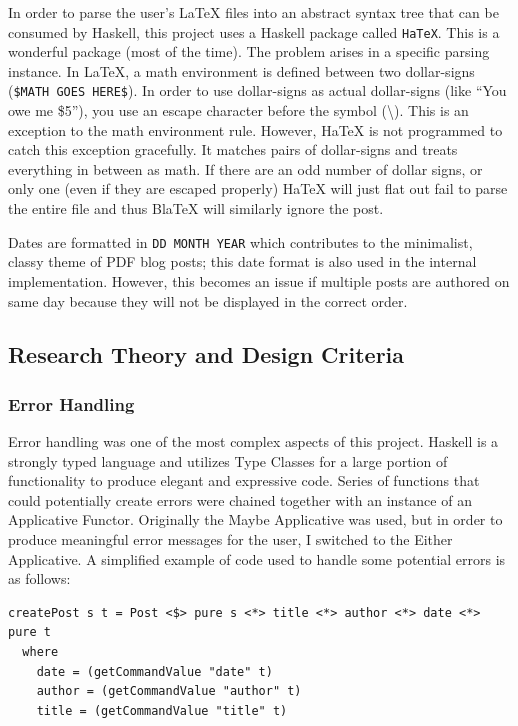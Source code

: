 \documentclass[doc,apacite,12pt]{apa6}
\begin{document}
  In order to parse the user's LaTeX files into an abstract syntax tree that can be consumed by Haskell, this project uses a Haskell package called \texttt{HaTeX}. This is a wonderful package (most of the time). The problem arises in a specific parsing instance. In LaTeX, a math environment is defined between two dollar-signs (\texttt{\$MATH GOES HERE\$}). In order to use dollar-signs as actual dollar-signs (like ``You owe me \$5''), you use an escape character before the symbol (\textbackslash). This is an exception to the math environment rule. However, HaTeX is not programmed to catch this exception gracefully. It matches pairs of dollar-signs and treats everything in between as math. If there are an odd number of dollar signs, or only one (even if they are escaped properly) HaTeX will just flat out fail to parse the entire file and thus BlaTeX will similarly ignore the post. 

  Dates are formatted in \texttt{DD MONTH YEAR} which contributes to the minimalist, classy theme of PDF blog posts; this date format is also used in the internal implementation. However, this becomes an issue if multiple posts are authored on same day because they will not be displayed in the correct order. 

\subsection{Research Theory and Design Criteria}
  \subsubsection{Error Handling}
    Error handling was one of the most complex aspects of this project. Haskell is a strongly typed language and utilizes Type Classes for a large portion of functionality to produce elegant and expressive code. Series of functions that could potentially create errors were chained together with an instance of an Applicative Functor. Originally the Maybe Applicative was used, but in order to produce meaningful error messages for the user, I switched to the Either Applicative. A simplified example of code used to handle some potential errors is as follows:
    
    \begin{verbatim}
createPost s t = Post <$> pure s <*> title <*> author <*> date <*> pure t
  where 
    date = (getCommandValue "date" t)
    author = (getCommandValue "author" t)
    title = (getCommandValue "title" t)
    \end{verbatim} 
\end{document}
